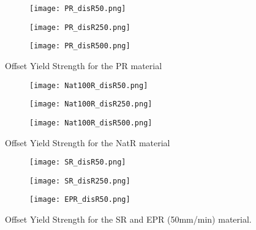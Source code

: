 \newpage
\begin{figure}[H]
    \vspace*{-2em}
    \centering
    \begin{subfigure}[b]{0.65\textwidth}
        \centering
        \texttt{[image: PR\_disR50.png]}
        \caption{}
        \label{fig:PR50}
    \end{subfigure}
    \begin{subfigure}[b]{0.65\textwidth}
        \centering
        \texttt{[image: PR\_disR250.png]}
        \caption{}
        \label{fig:PR250}
    \end{subfigure}
    \begin{subfigure}[b]{0.65\textwidth}
        \centering
        \texttt{[image: PR\_disR500.png]}
        \caption{}
        \label{fig:PR500}
    \end{subfigure}
    \caption{Offset Yield Strength for the PR material}
    \label{fig:PRoff}
\end{figure}
\newpage
\begin{figure}[H]
    \vspace*{-2em}
    \centering
    \begin{subfigure}[b]{0.65\textwidth}
        \centering
        \texttt{[image: Nat100R\_disR50.png]}
        \caption{}
        \label{fig:Nat100R50}
    \end{subfigure}
    \begin{subfigure}[b]{0.65\textwidth}
        \centering
        \texttt{[image: Nat100R\_disR250.png]}
        \caption{}
        \label{fig:Nat100R250}
    \end{subfigure}
    \begin{subfigure}[b]{0.65\textwidth}
        \centering
        \texttt{[image: Nat100R\_disR500.png]}
        \caption{}
        \label{fig:Nat100R500}
    \end{subfigure}
    \caption{Offset Yield Strength for the NatR material}
    \label{fig:Nat100Roff}
\end{figure}
\newpage
\begin{figure}[H]
    \vspace*{-2em}
    \centering
    \begin{subfigure}[b]{0.65\textwidth}
        \centering
        \texttt{[image: SR\_disR50.png]}
        \caption{}
        \label{fig:SR50}
    \end{subfigure}
    \begin{subfigure}[b]{0.65\textwidth}
        \centering
        \texttt{[image: SR\_disR250.png]}
        \caption{}
        \label{fig:SR250}
    \end{subfigure}
    \begin{subfigure}[b]{0.65\textwidth}
        \centering
        \texttt{[image: EPR\_disR50.png]}
        \caption{}
        \label{fig:EPR50}
    \end{subfigure}
    \caption{Offset Yield Strength for the SR and EPR (50mm/min) material.}
    \label{fig:SR-EPRoff}
\end{figure}
